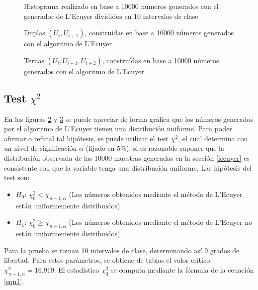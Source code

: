 \documentclass{sig-alternate}
\begin{document}
\begin{figure}[t]
\centering
\caption{Histograma realizado en base a 10000 n\'umeros generados con el generador de L'Ecuyer divididos en 10 intervalos de clase}
\label{histograma}
\end{figure}

\begin{figure}[t]
\centering
\caption{Duplas $(U_i , U_{i+1})$, constru\'idas en base a 10000 n\'umeros generados con el algoritmo de L'Ecuyer}
\label{en2D}
\end{figure}

\begin{figure}[t]
\centering
\caption{Ternas $(U_i, U_{i+1}, U_{i+2})$, constru\'idas en base a 10000 n\'umeros generados con el algoritmo de L'Ecuyer}
\label{en3D}
\end{figure}

\subsection{Test $\chi^2$}
\label{testChiCuadrado}

En las figuras \ref{en2D} y \ref{en3D} se puede apreciar de forma gr\'afica que los n\'umeros generados por el algoritmo de L'Ecuyer tienen una distribuci\'on uniforme. Para poder afirmar o refutal tal hip\'otesis, se puede utilizar el test $\chi^2$, el cual determina con un nivel de significaci\'on $\alpha$ (fijado en $5\%$), si es razonable suponer que la distribuci\'on observada de las 10000 muestras generadas en la secci\'on \ref{lecuyer} es consistente con que la variable tenga una distribuci\'on uniforme. Las hip\'otesis del test son:

\begin{itemize}
 \item {$H_{0}$:} $\chi_{0}^2 < \chi_{n-1,\alpha}$ (Los n\'umeros obtenidos mediante el m\'etodo de L'Ecuyer est\'an uniformemente distribuidos)
 \item {$H_{1}$:} $\chi_{0}^2 \ge \chi_{n-1,\alpha}$ (Los n\'umeros obtenidos mediante el m\'etodo de L'Ecuyer no est\'an uniformemente distribuidos)
\end{itemize}

Para la prueba se toman 10 intervalos de clase, determinando as\'i 9 grados de libertad. Para estos par\'ametros, se obtiene de tablas el valor cr\'itico $\chi_{n-1,\alpha}^{2} = 16.919$. El estad\'istico $\chi_{0}^{2}$ se computa mediante la f\'ormula de la ecuaci\'on \ref{eqn1}.
\end{document}
